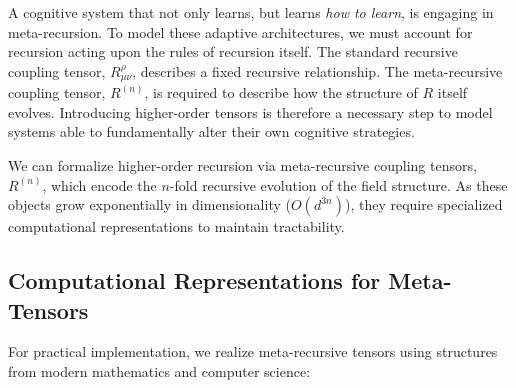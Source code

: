 A cognitive system that not only learns, but learns \textit{how to learn}, is engaging in meta-recursion. To model these adaptive architectures, we must account for recursion acting upon the rules of recursion itself. The standard recursive coupling tensor, \(R^\rho_{\mu\nu}\), describes a fixed recursive relationship. The meta-recursive coupling tensor, \(R^{(n)}\), is required to describe how the structure of \(R\) itself evolves. Introducing higher-order tensors is therefore a necessary step to model systems able to fundamentally alter their own cognitive strategies.

We can formalize higher-order recursion via meta-recursive coupling tensors, \(R^{(n)}\), which encode the \(n\)-fold recursive evolution of the field structure. As these objects grow exponentially in dimensionality (\(O(d^{3n})\)), they require specialized computational representations to maintain tractability.


\subsection{Computational Representations for Meta-Tensors}
\label{17.4.2:computational_representations_for_meta_tensors}

For practical implementation, we realize meta-recursive tensors using structures from modern mathematics and computer science:

